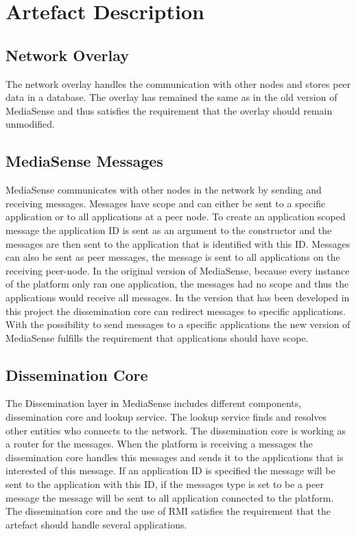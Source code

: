 \section{Artefact Description}

\subsection{Network Overlay}
The network overlay handles the communication with other nodes and stores peer data in a database. The overlay has remained the same as in the old version of MediaSense and thus satisfies the requirement that the overlay should remain unmodified.

\subsection{MediaSense Messages}
MediaSense communicates with other nodes in the network by sending and receiving messages. Messages have scope and can either be sent to a specific application or to all applications at a peer node. 
To create an application scoped message the application ID is sent as an argument to the constructor and the messages are then sent to the application that is identified with this ID. 
Messages can also be sent as peer messages, the message is sent to all applications on the receiving peer-node. In the original version of MediaSense, because every instance of the platform only ran one application, the messages had no scope and thus the applications would receive all messages. 
In the version that has been developed in this project the dissemination core can redirect messages to specific applications. With the possibility to send messages to a specific applications the new version of MediaSense fulfills the requirement that applications should have scope.

\subsection{Dissemination Core}
The Dissemination layer in MediaSense includes different components, dissemination core and lookup service. The lookup service finds and resolves other entities who connects to the network. The dissemination core is working as a router for the messages. When the platform is receiving a messages the dissemination core handles this messages and sends it to the applications that is interested of this message. If an application ID is specified the message will be sent to the application with this ID, if the messages type is set to be a peer message the message will be sent to all application connected to the platform. The dissemination core and the use of RMI satisfies the requirement that the artefact should handle several applications.

